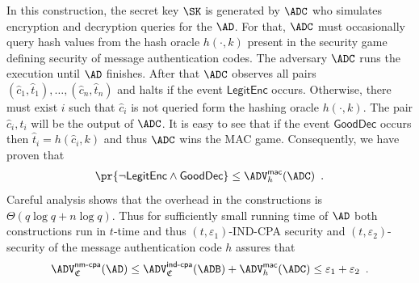 \documentclass{crypto-exercise}
\newcommand{\ADVNMCPA}[2]{\ADV^{\mathsf{nm\text{-}cpa}}_{#1}{(#2)}}
\newcommand{\ADVMAC}[2]{\ADV^{\mathsf{mac}}_{#1}{(#2)}}
\newcommand{\CS}{\mathfrak{C}}
\newcommand{\LENC}{\mathsf{LegitEnc}}
\newcommand{\GDEC}{\mathsf{GoodDec}}
\begin{document}
\begin{solution}
In this construction, the secret key $\SK$ is generated by $\ADC$ who simulates encryption and decryption queries for the $\AD$. For that, $\ADC$ must occasionally query hash values from the hash oracle $h(\cdot,k)$ present in the security game defining security of message authentication codes. The adversary $\ADC$ runs the execution until $\AD$ finishes. After that $\ADC$ observes all pairs $(\hat{c}_1,\hat{t}_1),\ldots,(\hat{c}_n,\hat{t}_n)$ and halts if the event $\LENC$ occurs. Otherwise, there must exist $i$ such that $\hat{c}_i$ is not queried form the hashing oracle $h(\cdot,k)$. The pair $\hat{c}_i,\hat{t}_i$ will be the output of $\ADC$. It is easy to see that if the event $\GDEC$ occurs then $\hat{t}_i=h(\hat{c}_i,k)$ and thus $\ADC$ wins the MAC game. Consequently, we have proven that 
\begin{align*}
\pr{\neg\LENC\wedge\GDEC} \leq \ADVMAC{h}{\ADC}\enspace.
\end{align*}   
Careful analysis shows that the overhead in the constructions is $\Theta(q\log q +n\log q)$. Thus for sufficiently small running time of $\AD$ both constructions run in $t$-time and thus $(t,\varepsilon_1)$-IND-CPA security and $(t,\varepsilon_2)$-security of the message authentication code $h$ assures that 
\begin{align*}
\ADVNMCPA{\CS}{\AD}\leq \ADVINDCPA{\CS}{\ADB} + \ADVMAC{h}{\ADC}\leq \varepsilon_1+\varepsilon_2\enspace.
\end{align*}




\end{solution}
\end{document}
